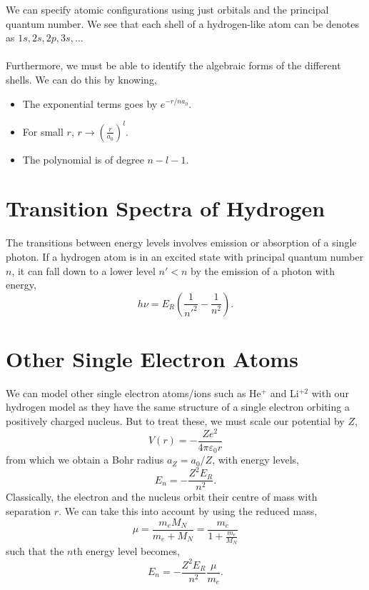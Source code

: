\documentclass{book}
\begin{document}
We can specify atomic configurations using just orbitals and the principal quantum number. We see that each shell of a hydrogen-like atom can be denotes as $1s,2s,2p,3s,\ldots$ 
\\\\
Furthermore, we must be able to identify the algebraic forms of the different shells. We can do this by knowing,
\begin{itemize}
	\item The exponential terms goes by $e^{-r/na_0}$.
	\item For small $r$, $r \to \left(\frac{r}{a_0}\right)^l$.
	\item The polynomial is of degree $n - l -1$.
\end{itemize}
\section{Transition Spectra of Hydrogen}
The transitions between energy levels involves emission or absorption of a single photon. If a hydrogen atom is in an excited state with principal quantum number $n$, it can fall down to a lower level $n' < n$ by the emission of a photon with energy,
\begin{equation}
	h\nu  = E_R\left(\frac{1}{n'^2} - \frac{1}{n^2}\right).
\end{equation}
\section{Other Single Electron Atoms}
We can model other single electron atoms/ions such as He$^+$ and Li$^{+2}$ with our hydrogen model as they have the same structure of a single electron orbiting a positively charged nucleus. But to treat these, we must scale our potential by $Z$,
\begin{equation}
	V(r) = -\frac{Ze^2}{4\pi\varepsilon_0r}
\end{equation}
from which we obtain a Bohr radius $a_Z = a_0/Z$, with energy levels,
\begin{equation}
	E_n = -\frac{Z^2E_R}{n^2}.
\end{equation}
Classically, the electron and the nucleus orbit their centre of mass with separation $r$. We can take this into account by using the reduced mass,
\begin{equation}
	\mu = \frac{m_eM_N}{m_e + M_N} = \frac{m_e}{1 + \frac{m_e}{M_N}}
\end{equation}
such that the $n$th energy level becomes,
\begin{equation}
	E_n = -\frac{Z^2E_R}{n^2}\frac{\mu}{m_e}.
\end{equation}
\end{document}

